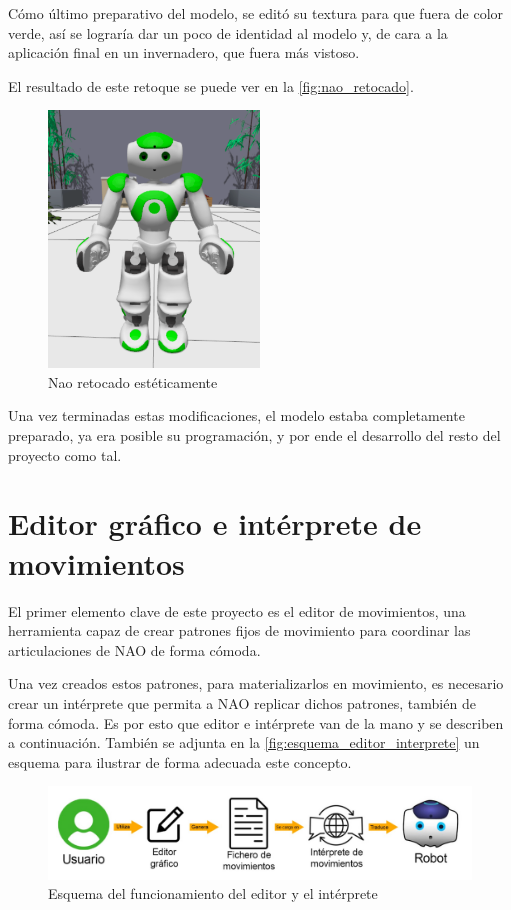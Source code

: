 Cómo último preparativo del modelo, se editó su textura para que fuera de color verde, así se lograría dar un poco de identidad al modelo y, de cara a la aplicación final en un invernadero, que fuera más vistoso.

El resultado de este retoque se puede ver en la \autoref{fig:nao_retocado}.

\begin{figure}[H]
  \centering
  \includegraphics[width=0.5\textwidth]{figures/cap_4/GreenNao.png}
  \caption{Nao retocado estéticamente}
  \label{fig:nao_retocado}
\end{figure}

Una vez terminadas estas modificaciones, el modelo estaba completamente preparado, ya era posible su programación, y por ende el desarrollo del resto del proyecto como tal.

\section{Editor gráfico e intérprete de movimientos}

El primer elemento clave de este proyecto es el editor de movimientos, una herramienta capaz de crear patrones fijos de movimiento para coordinar las articulaciones de NAO de forma cómoda.

Una vez creados estos patrones, para materializarlos en movimiento, es necesario crear un intérprete que permita a NAO replicar dichos patrones, también de forma cómoda. Es por esto que editor e intérprete van de la mano y se describen a continuación. También se adjunta en la \autoref{fig:esquema_editor_interprete} un esquema para ilustrar de forma adecuada este concepto.

\begin{figure}[H]
  \centering
  \includegraphics[width=1.05\textwidth]{figures/cap_4/esquema_ed_in.jpeg}
  \caption{Esquema del funcionamiento del editor y el intérprete}
  \label{fig:esquema_editor_interprete}
\end{figure}

